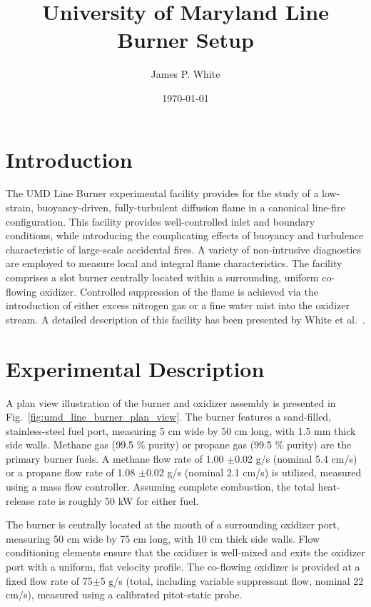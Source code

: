 \documentclass{article}
\title{University of Maryland Line Burner Setup}
\author{James P. White}
\date{\today}
\begin{document}
\maketitle

\section{Introduction}

The UMD Line Burner experimental facility provides for the study of a low-strain, buoyancy-driven, fully-turbulent diffusion flame in a canonical line-fire configuration. This facility provides well-controlled inlet and boundary conditions, while introducing the complicating effects of buoyancy and turbulence characteristic of large-scale accidental fires. A variety of non-intrusive diagnostics are employed to measure local and integral flame characteristics. The facility comprises a slot burner centrally located within a surrounding, uniform co-flowing oxidizer. Controlled suppression of the flame is achieved via the introduction of either excess nitrogen gas or a fine water mist into the oxidizer stream. A detailed description of this facility has been presented by White et al.~\cite{White:2015}.

\section{Experimental Description}

A plan view illustration of the burner and oxidizer assembly is presented in Fig.~\ref{fig:umd_line_burner_plan_view}.  The burner features a sand-filled, stainless-steel fuel port, measuring 5 cm wide by 50 cm long, with 1.5 mm thick side walls. Methane gas (99.5 \% purity) or propane gas (99.5 \% purity) are the primary burner fuels. A methane flow rate of 1.00 $\pm$0.02 g/s (nominal 5.4 cm/s) or a propane flow rate of 1.08 $\pm$0.02 g/s (nominal 2.1 cm/s) is utilized, measured using a mass flow controller. Assuming complete combustion, the total heat-release rate is roughly 50 kW for either fuel.

The burner is centrally located at the mouth of a surrounding oxidizer port, measuring 50 cm wide by 75 cm long, with 10 cm thick side walls. Flow conditioning elements ensure that the oxidizer is well-mixed and exits the oxidizer port with a uniform, flat velocity profile. The co-flowing oxidizer is provided at a fixed flow rate of 75$\pm$5 g/s (total, including variable suppressant flow, nominal 22 cm/s), measured using a calibrated pitot-static probe.
\end{document}
